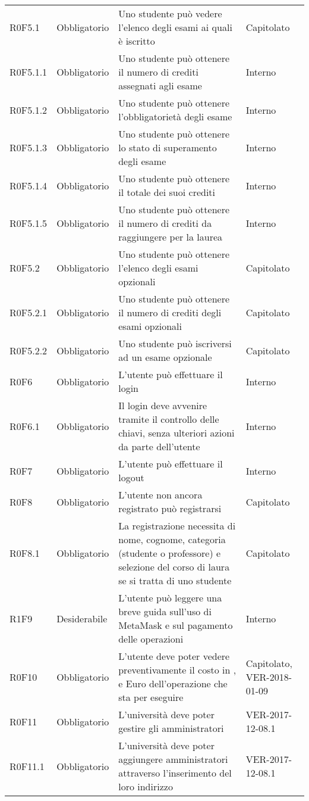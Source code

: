 \documentclass[AnalisiDeiRequisiti.tex]{subfiles}
\begin{document}
\begin{longtable}[H]{p{2.6cm}p{2.5cm}p{5cm}p{2cm}}
	R0F5.1 & Obbligatorio & Uno studente può vedere l'elenco degli esami ai quali è iscritto & Capitolato \\
	R0F5.1.1 & Obbligatorio & Uno studente può ottenere il numero di crediti assegnati agli esame & Interno \\
	R0F5.1.2 & Obbligatorio & Uno studente può ottenere l'obbligatorietà degli esame & Interno \\
	R0F5.1.3 & Obbligatorio & Uno studente può ottenere lo stato di superamento degli esame & Interno \\
	R0F5.1.4 & Obbligatorio & Uno studente può ottenere il totale dei suoi crediti & Interno \\
	R0F5.1.5 & Obbligatorio & Uno studente può ottenere il numero di crediti da raggiungere per la laurea & Interno \\
	R0F5.2 & Obbligatorio & Uno studente può ottenere l'elenco degli esami opzionali & Capitolato \\
	R0F5.2.1 & Obbligatorio & Uno studente può ottenere il numero di crediti degli esami opzionali & Capitolato \\
	R0F5.2.2 & Obbligatorio & Uno studente può iscriversi ad un esame opzionale & Capitolato \\
	R0F6 & Obbligatorio & L'utente può effettuare il login & Interno \\
	R0F6.1 & Obbligatorio & Il login deve avvenire tramite il controllo delle chiavi, senza ulteriori azioni da parte dell'utente & Interno \\
	R0F7 & Obbligatorio & L'utente può effettuare il logout & Interno \\
	R0F8 & Obbligatorio & L'utente non ancora registrato può registrarsi & Capitolato \\
	R0F8.1 & Obbligatorio & La registrazione necessita di nome, cognome, categoria (studente o professore) e selezione del corso di laura se si tratta di uno studente & Capitolato \\
	R1F9 & Desiderabile & L'utente può leggere una breve guida sull'uso di MetaMask e sul pagamento delle operazioni & Interno \\	
	R0F10 & Obbligatorio & L'utente deve poter vedere preventivamente il costo in \citGloss{Gas}, \citGloss{Ether} e Euro dell'operazione che sta per eseguire & Capitolato, VER-2018-01-09 \\	
	R0F11 & Obbligatorio & L'università deve poter gestire gli amministratori & VER-2017-12-08.1 \\
	R0F11.1 & Obbligatorio & L'università deve poter aggiungere amministratori attraverso l'inserimento del loro indirizzo & VER-2017-12-08.1 \\

\end{longtable}
\end{document}
